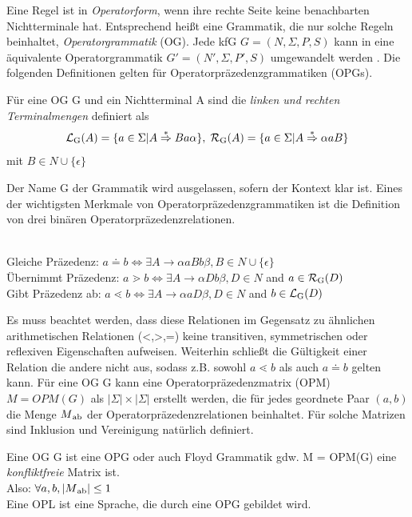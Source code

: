 Eine Regel ist in \textit{Operatorform}, wenn ihre rechte Seite keine benachbarten Nichtterminale hat. Entsprechend heißt eine Grammatik, die nur solche Regeln beinhaltet, \textit{Operatorgrammatik} (OG). Jede kfG $G=(N,\Sigma, P, S)$ kann in eine äquivalente Operatorgrammatik $G'=(N', \Sigma, P', S)$ umgewandelt werden \cite{og, salomaa1973formal}. Die folgenden Definitionen gelten für Operatorpräzedenzgrammatiken (OPGs). \\
\begin{definition}

Für eine OG G und ein Nichtterminal A sind die \textit{linken und rechten Terminalmengen}  definiert als 
$$ \mathcal{L} \textsubscript{G}(A) = \{ a \in \Sigma | A \overset{*}{\Rightarrow} Ba \alpha \}, \;
 \mathcal{R} \textsubscript{G}(A) = \{ a \in \Sigma | A \overset{*}{\Rightarrow} \alpha aB \}$$
mit $B \in N \cup \{\epsilon\}$
\end{definition}

Der Name G der Grammatik wird ausgelassen, sofern der Kontext klar ist. Eines der wichtigsten Merkmale von Operatorpräzedenzgrammatiken ist die Definition von drei binären Operatorpräzedenzrelationen.
\begin{definition}[Präzedenzrelationen]\ \\
\label{relationen}
Gleiche Präzedenz: $ a \doteq b \Leftrightarrow \exists A \rightarrow \alpha aBb \beta , 
		B \in N \cup \{ \epsilon \}$ \\
		Übernimmt Präzedenz: $ a \gtrdot b \Leftrightarrow \exists A \rightarrow \alpha Db \beta , D \in N $ and $ a \in
		\mathcal{R}\textsubscript{G}(D)$ \\
		Gibt Präzedenz ab: $ a \lessdot b \Leftrightarrow \exists A \rightarrow \alpha aD \beta , D \in N $ and $ b \in
		\mathcal{L}\textsubscript{G}(D)$
\end{definition}
Es muss beachtet werden, dass diese Relationen im Gegensatz zu ähnlichen arithmetischen Relationen (<,>,=) keine transitiven, symmetrischen oder reflexiven Eigenschaften aufweisen. Weiterhin schließt die Gültigkeit einer Relation die andere nicht aus, sodass z.B. sowohl $a \lessdot b$ als auch $a \doteq b$ gelten kann.
Für eine OG G kann eine Operatorpräzedenzmatrix (OPM) $M = OPM(G)$ als $|\Sigma | \times |\Sigma |$ erstellt werden, die für jedes geordnete Paar $(a,b)$ die Menge $M \textsubscript{ab}$ der Operatorpräzedenzrelationen beinhaltet. Für solche Matrizen sind Inklusion und Vereinigung natürlich definiert.

\begin{definition}
Eine OG G ist eine OPG oder auch Floyd Grammatik gdw. M = OPM(G) eine \textit{konfliktfreie} Matrix ist.\\ 
Also: $\forall a, b, |M \textsubscript{ab} | \leq 1$\\
Eine OPL ist eine Sprache, die durch eine OPG gebildet wird.
\end{definition}

